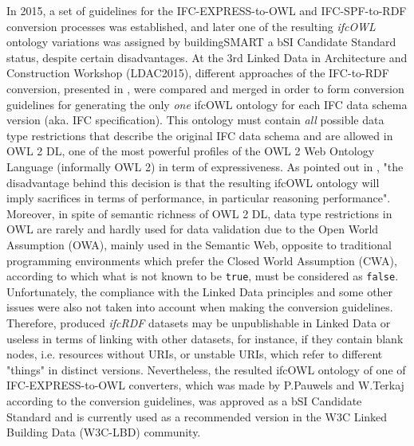 In 2015, a set of guidelines for the IFC-EXPRESS-to-OWL and IFC-SPF-to-RDF conversion processes was established, and later one of the resulting \emph{ifcOWL} ontology variations was assigned by buildingSMART a bSI Candidate Standard status, despite certain disadvantages.
At the 3rd Linked Data in Architecture and Construction Workshop (LDAC2015), different approaches of the IFC-to-RDF conversion, presented in \cite{pauwels2016express, vu2015implementation, vu2014opening}, were compared and merged in order to form conversion guidelines for generating the only \emph{one} ifcOWL ontology for each IFC data schema version (aka. IFC specification)\cite{pauwels2015third}.
This ontology must contain \emph{all} possible data type restrictions that describe the original IFC data schema and are allowed in OWL 2 DL, one of the most powerful profiles of the OWL 2 Web Ontology Language (informally OWL 2) in term of expressiveness.
As pointed out in \cite{pauwels2016express}, "the disadvantage behind this decision is that the resulting ifcOWL ontology will imply sacrifices in terms of performance, in particular reasoning performance".
Moreover, in spite of semantic richness of OWL 2 DL, data type restrictions in OWL are rarely and hardly used for data validation due to the Open World Assumption (OWA), mainly used in the Semantic Web, opposite to traditional programming environments which prefer the Closed World Assumption (CWA), according to which what is not known to be \texttt{true}, must be considered as \texttt{false}.
Unfortunately, the compliance with the Linked Data principles and some other issues were also not taken into account when making the conversion guidelines.
Therefore, produced \emph{ifcRDF} datasets may be unpublishable in Linked Data or useless in terms of linking with other datasets, for instance, if they contain blank nodes, i.e. resources without URIs, or unstable URIs, which refer to different "things" in distinct versions.
Nevertheless, the resulted ifcOWL ontology of one of IFC-EXPRESS-to-OWL converters, which was made by P.Pauwels and W.Terkaj \cite{pauwels2016express} according to the conversion guidelines, was approved as a bSI Candidate Standard and is currently used as a recommended version in the W3C Linked Building Data (W3C-LBD) community.





